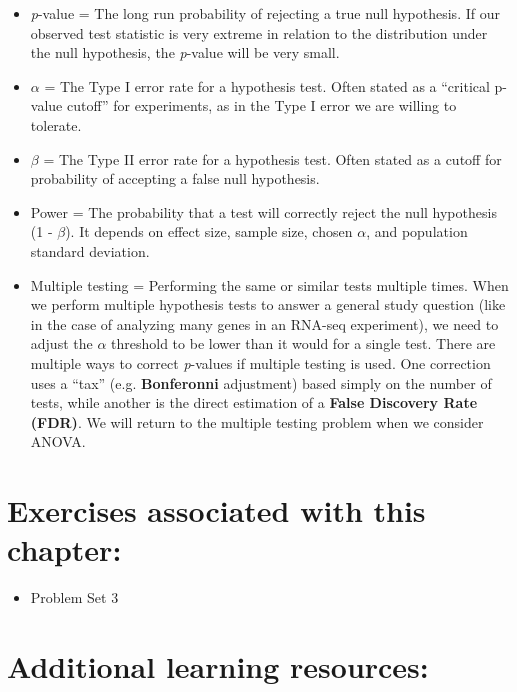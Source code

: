 \documentclass[]{book}
\providecommand{\tightlist}{%
  \setlength{\itemsep}{0pt}\setlength{\parskip}{0pt}}
\begin{document}
\begin{itemize}
\item
  \emph{p}-value = The long run probability of rejecting a true null hypothesis. If our observed test statistic is very extreme in relation to the distribution under the null hypothesis, the \emph{p}-value will be very small.
\item
  \(\alpha\) = The Type I error rate for a hypothesis test. Often stated as a ``critical p-value cutoff'' for experiments, as in the Type I error we are willing to tolerate.
\item
  \(\beta\) = The Type II error rate for a hypothesis test. Often stated as a cutoff for probability of accepting a false null hypothesis.
\item
  Power = The probability that a test will correctly reject the null hypothesis (1 - \(\beta\)). It depends on effect size, sample size, chosen \(\alpha\), and population standard deviation.
\item
  Multiple testing = Performing the same or similar tests multiple times. When we perform multiple hypothesis tests to answer a general study question (like in the case of analyzing many genes in an RNA-seq experiment), we need to adjust the \(\alpha\) threshold to be lower than it would for a single test. There are multiple ways to correct \emph{p}-values if multiple testing is used. One correction uses a ``tax'' (e.g. \textbf{Bonferonni} adjustment) based simply on the number of tests, while another is the direct estimation of a \textbf{False Discovery Rate (FDR)}. We will return to the multiple testing problem when we consider ANOVA.
\end{itemize}

\hypertarget{exercises-associated-with-this-chapter-6}{%
\section{Exercises associated with this chapter:}\label{exercises-associated-with-this-chapter-6}}

\begin{itemize}
\tightlist
\item
  Problem Set 3
\end{itemize}

\hypertarget{additional-learning-resources-6}{%
\section{Additional learning resources:}\label{additional-learning-resources-6}}
\end{document}
